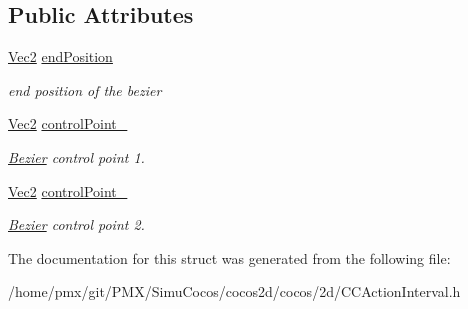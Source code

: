 \subsection*{Public Attributes}
\begin{DoxyCompactItemize}
\item 
\mbox{\label{struct__ccBezierConfig_a3c51963237c96dbe01af0838f31a528b}} 
\hyperlink{classVec2}{Vec2} \hyperlink{struct__ccBezierConfig_a3c51963237c96dbe01af0838f31a528b}{end\+Position}
\begin{DoxyCompactList}\small\item\em end position of the bezier \end{DoxyCompactList}\item 
\mbox{\label{struct__ccBezierConfig_a44fc431ed2be15f6235aeac2367cb6c6}} 
\hyperlink{classVec2}{Vec2} \hyperlink{struct__ccBezierConfig_a44fc431ed2be15f6235aeac2367cb6c6}{control\+Point\+\_}
\begin{DoxyCompactList}\small\item\em \hyperlink{structBezier}{Bezier} control point 1. \end{DoxyCompactList}\item 
\mbox{\label{struct__ccBezierConfig_a5e16e7e41cd146980a0157d547ade6d9}} 
\hyperlink{classVec2}{Vec2} \hyperlink{struct__ccBezierConfig_a5e16e7e41cd146980a0157d547ade6d9}{control\+Point\+\_}
\begin{DoxyCompactList}\small\item\em \hyperlink{structBezier}{Bezier} control point 2. \end{DoxyCompactList}\end{DoxyCompactItemize}


The documentation for this struct was generated from the following file\+:\begin{DoxyCompactItemize}
\item 
/home/pmx/git/\+P\+M\+X/\+Simu\+Cocos/cocos2d/cocos/2d/C\+C\+Action\+Interval.\+h\end{DoxyCompactItemize}
